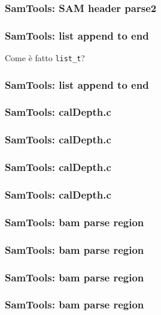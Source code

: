 \begin{frame}[fragile]
\frametitle{SamTools: SAM header parse2}

\end{frame}


\begin{frame}[fragile]
\frametitle{SamTools: list append to end}


Come è fatto \verb+list_t+?
\end{frame}


\begin{frame}[fragile]
\frametitle{SamTools: list append to end}

\end{frame}





\begin{frame}[fragile]
\frametitle{SamTools: calDepth.c}

\end{frame}
\begin{frame}[fragile]
\frametitle{SamTools: calDepth.c}

\end{frame}
\begin{frame}[fragile]
\frametitle{SamTools: calDepth.c}

\end{frame}
\begin{frame}[fragile]
\frametitle{SamTools: calDepth.c}

\end{frame}

\begin{frame}[fragile]
\frametitle{SamTools: bam parse region}

\end{frame}
\begin{frame}[fragile]
\frametitle{SamTools: bam parse region}

\end{frame}
\begin{frame}[fragile]
\frametitle{SamTools: bam parse region}

\end{frame}
\begin{frame}[fragile]
\frametitle{SamTools: bam parse region}

\end{frame}



